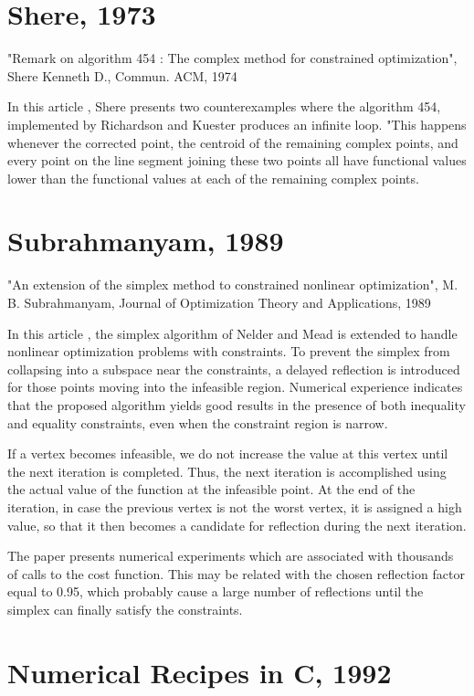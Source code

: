 \section{Shere, 1973}

"Remark on algorithm 454 : The complex method for constrained optimization",
Shere Kenneth D.,
Commun. ACM,
1974

In this article \cite{372783}, Shere presents two counterexamples where the algorithm 454,
implemented by Richardson and Kuester produces an infinite loop.
"This happens whenever the corrected point, the centroid of the remaining 
complex points, and every point on the line segment joining these two points
all have functional values lower than the functional values at each of the
remaining complex points.

\section{Subrahmanyam, 1989}

"An extension of the simplex method to constrained nonlinear optimization",
M. B. Subrahmanyam, Journal of Optimization Theory and Applications, 1989

In this article \cite{69970}, the simplex algorithm of Nelder and Mead is extended to handle nonlinear 
optimization problems with constraints. To prevent the simplex from 
collapsing into a subspace near the constraints, a delayed reflection is 
introduced for those points moving into the infeasible region. Numerical 
experience indicates that the proposed algorithm yields good results in 
the presence of both inequality and equality constraints, even when the 
constraint region is narrow. 

If a vertex becomes infeasible, we do not increase the value at this 
vertex until the next iteration is completed. Thus, the next iteration
is accomplished using the actual value of the function at the infeasible 
point. At the end of the iteration, in case the previous vertex is not the worst
vertex, it is assigned a high value, so that it then becomes a candidate
for reflection during the next iteration.

The paper presents numerical experiments which are associated with 
thousands of calls to the cost function. This may be related with 
the chosen reflection factor equal to 0.95, which probably cause 
a large number of reflections until the simplex can finally 
satisfy the constraints.

\section{Numerical Recipes in C, 1992}

